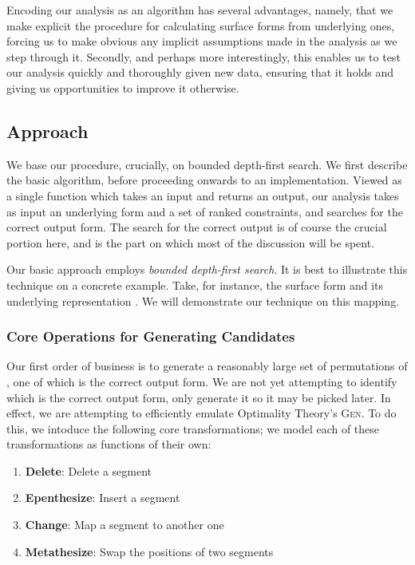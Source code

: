 \documentclass[12pt]{article}
\begin{document}
Encoding our analysis as an algorithm has several advantages, namely, that we
make explicit the procedure for calculating surface forms from underlying ones,
forcing us to make obvious any implicit assumptions made in the analysis as we
step through it. Secondly, and perhaps more interestingly, this enables us to
test our analysis quickly and thoroughly given new data, ensuring that it holds
and giving us opportunities to improve it otherwise.

\subsection{Approach}

We base our procedure, crucially, on bounded depth-first search. We first
describe the basic algorithm, before proceeding onwards to an implementation.
Viewed as a single function which takes an input and returns an output, our
analysis takes as input an underlying form and a set of ranked constraints,
and searches for the correct output form. The search for the correct output
is of course the crucial portion here, and is the part on which most of the
discussion will be spent.

Our basic approach employs \textit{bounded depth-first search}. It is best to
illustrate this technique on a concrete example. Take, for instance, the
surface form \textipa{[sol\'u]} and its underlying representation
. We will demonstrate our technique on this mapping.

\subsubsection{Core Operations for Generating Candidates}

Our first order of business is to generate a reasonably large set of
permutations of \textipa{[sol\'u]}, one of which is the correct output form. We
are not yet attempting to identify which is the correct output form, only
generate it so it may be picked later. In effect, we are attempting to
efficiently emulate Optimality Theory's \textsc{Gen}. To do this, we intoduce
the following core transformations; we model each of these transformations as
functions of their own:

\begin{enumerate}
    \item \textbf{Delete}: Delete a segment
    \item \textbf{Epenthesize}: Insert a segment
    \item \textbf{Change}: Map a segment to another one
    \item \textbf{Metathesize}: Swap the positions of two segments
\end{enumerate}
\end{document}

